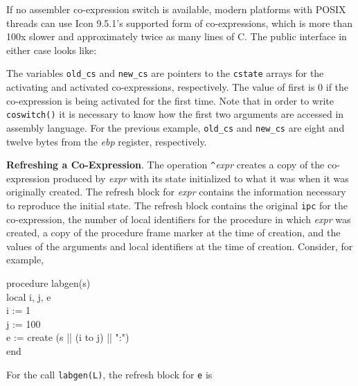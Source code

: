 If no assembler co-expression switch is available, modern platforms
with POSIX threads can use Icon 9.5.1's supported form of
co-expressions, which is more than 100x slower and approximately twice
as many lines of C. The public interface in either case looks like:


The variables \texttt{old\_cs} and \texttt{new\_cs} are pointers to
the \texttt{cstate} arrays for the activating and activated
co-expressions, respectively. The value of first is 0 if the
co-expression is being activated for the first time. Note that in
order to write \texttt{coswitch()} it is necessary to know how the
first two arguments are accessed in assembly language. For the
previous example, \texttt{old\_cs} and \texttt{new\_cs} are eight and
twelve bytes from the \textit{ebp }register, respectively.

\textbf{Refreshing a Co-Expression}. The operation
\texttt{\textit{\^{}}}\textit{expr} creates a copy of
the co-expression produced by \textit{expr} with its
state initialized to what it was when it was originally created. The
refresh block for \textit{expr} contains the
information necessary to reproduce the initial state. The refresh
block contains the original \texttt{ipc} for the co-expression, the
number of local identifiers for the procedure in which
\textit{expr} was created, a copy of the procedure
frame marker at the time of creation, and the values of the arguments
and local identifiers at the time of creation. Consider, for example,

\begin{iconcode}
\>procedure labgen(s)\\
\>\>local i, j, e\\
\>\>i := 1\\
\>\>j := 100\\
\>\>e := create (s || (i to j) || ":")\\
\>end
\end{iconcode}


For the call \texttt{labgen({\textquotedbl}L{\textquotedbl})}, the refresh block for \texttt{e} is


